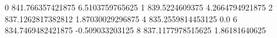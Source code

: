 0 841.766357421875 6.5103759765625
1 839.5224609375 4.2664794921875
2 837.1262817382812 1.87030029296875
4 835.2559814453125 0.0
6 834.7469482421875 -0.509033203125
8 837.1177978515625 1.86181640625
